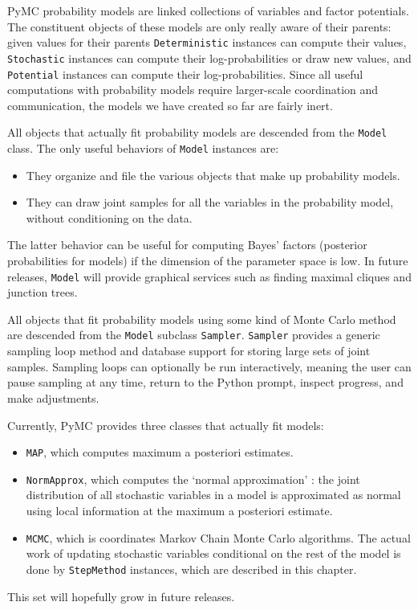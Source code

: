PyMC probability models are linked collections of variables and factor potentials. The constituent objects of these models are only really aware of their parents: given values for their parents \texttt{Deterministic} instances can compute their values, \texttt{Stochastic} instances can compute their log-probabilities or draw new values, and \texttt{Potential} instances can compute their log-probabilities. Since all useful computations with probability models require larger-scale coordination and communication, the models we have created so far are fairly inert.

All objects that actually fit probability models are descended from the \texttt{Model} class. The only useful behaviors of \texttt{Model} instances are:
\begin{itemize}
    \item They organize and file the various objects that make up probability models.
    \item They can draw joint samples for all the variables in the probability model, without conditioning on the data.
\end{itemize}
The latter behavior can be useful for computing Bayes' factors (posterior probabilities for models) if the dimension of the parameter space is low. In future releases, \texttt{Model} will provide graphical services such as finding maximal cliques and junction trees.

All objects that fit probability models using some kind of Monte Carlo method are descended from the \texttt{Model} subclass \texttt{Sampler}. \texttt{Sampler} provides a generic sampling loop method and database support for storing large sets of joint samples. Sampling loops can optionally be run interactively, meaning the user can pause sampling at any time, return to the Python prompt, inspect progress, and make adjustments.

Currently, PyMC provides three classes that actually fit models:
\begin{itemize}
    \item \texttt{MAP}, which computes maximum a posteriori estimates.
    \item \texttt{NormApprox}, which computes the `normal approximation' \cite{gelman}: the joint distribution of all stochastic variables in a model is approximated as normal using local information at the maximum a posteriori estimate.
    \item \texttt{MCMC}, which is coordinates Markov Chain Monte Carlo algorithms. The actual work of updating stochastic variables conditional on the rest of the model is done by \texttt{StepMethod} instances, which are described in this chapter.
\end{itemize}
This set will hopefully grow in future releases. 



